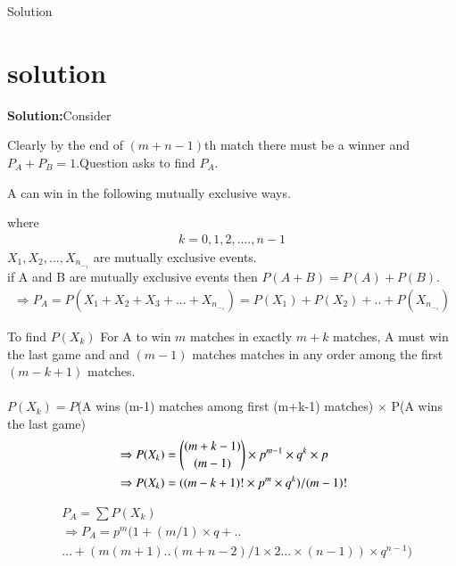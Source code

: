 \documentclass{beamer}
\begin{document}
\begin{frame}{Solution}
\section{solution}
\textbf{Solution:}Consider
\begin{table}[ht!]
\centering
			
			\caption{}
			\label{Table:1}
\end{table}
Clearly by the end of $(m+n-1)$th match there must be a winner and $P_A+P_B=1$.Question asks to find $P_A$.
\end{frame}
\begin{frame}
  A can win in the following mutually exclusive ways.  
\begin{table}[ht!]
\centering
			
			\caption{}
			\label{Table:2}
\end{table}
where
\begin{align}
   k=0,1,2,....,n-1
\end{align}
$X_1,X_2,...,X_n_-_1$ are mutually exclusive events.\\
if A and B are mutually exclusive events then $P(A+B)=P(A)+P(B)$.
\begin{align}
   \Rightarrow P_A=P(X_1+X_2+X_3+...+X_n_-_1)=P(X_1)+P(X_2)+..+P(X_n_-_1)
\end{align}
\end{frame}
\begin{frame}
\begin{block}{To find $P(X_k)$}
For A to win $m$ matches in exactly $m+k$ matches, A must win the last game and and $(m-1)$ matches matches in any order among the first $(m-k+1)$ matches.\\\\
    $P(X_k)=P$(A wins (m-1) matches among first (m+k-1) matches) $\times$ P(A wins the last game)
    \begin{align}
        &\Rightarrow P(X_k)=\binom{(m+k-1)}{(m-1)} \times {p}^{m-1} \times q^{k}\times p\\
        &\Rightarrow P(X_k)=((m-k+1)! {\displaystyle} \times p^{m} \times q^{k}) /(m-1)! {\displaystyle}
    \end{align}
\end{block}

\begin{align}
&P_A=\sum P(X_k) \\
&\Rightarrow P_A=p^{m}(1+(m/1) \times q+..\nonumber\\
&...+(m(m+1)..(m+n-2)/1\times2...\times(n-1))\times q^{n-1})
 \end{align}

 \end{frame}
\end{document}
